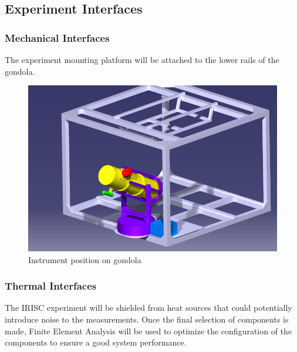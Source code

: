 \subsection{Experiment Interfaces}

\subsubsection{Mechanical Interfaces}
\label{sec:4.2.1}


The experiment mounting platform will be attached to the lower rails of the gondola.



\begin{figure}[H]
    \centering
	\includegraphics[width=0.9\linewidth]{4-experiment-design/img/mechanical/Assembly_v3iso2.png}
	\caption{Instrument position on gondola}
\end{figure}


% 


\subsubsection{Thermal Interfaces}


The IRISC experiment will be shielded from heat sources that could potentially introduce noise to the measurements. Once the final selection of components is made, Finite Element Analysis will be used to optimize the configuration of the components to ensure a good system performance.

